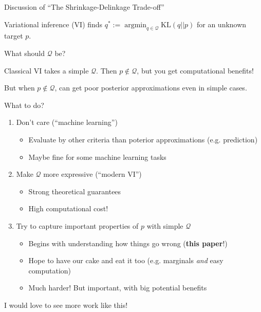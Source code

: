 \documentclass[8pt]{beamer}\usepackage[]{graphicx}\usepackage[]{color}
\DeclareMathOperator*{\argmin}{\mathrm{argmin}}
\def\kl#1#2{\mathrm{KL}\left(#1 || #2\right)}
\def\qdom{\mathcal{Q}}
\def\q{q}
\def\p{p}
\begin{document}

\begin{frame}{Discussion of ``The Shrinkage-Delinkage Trade-off''}

Variational inference (VI) finds
$q^* := \argmin_{\q \in \qdom} \kl{\q}{\p}$ for an unknown target $\p$.
%
%

What should $\qdom$ be?

\pause

Classical VI takes a simple $\qdom$. Then $\p \notin \qdom$, but 
you get computational benefits!

\pause

But when $\p \notin \qdom$, can get poor posterior approximations even in simple
cases.  

What to do?

\pause
%
\begin{enumerate}
%
\item Don't care (``machine learning'')
%
\begin{itemize}
    \item Evaluate by other criteria than
    poterior approximations (e.g. prediction)
    \item Maybe fine for some machine learning tasks
\end{itemize}
%
\pause
\item Make $\qdom$ more expressive (``modern VI'')
%
\begin{itemize}
    \item Strong theoretical guarantees
    \item High computational cost!
\end{itemize}
\pause
%
\item Try to capture important properties of $\p$ with simple $\qdom$
%
\begin{itemize}
    \item Begins with understanding how things go wrong (\textbf{this paper}!)
    \item Hope to have our cake and eat it too (e.g. marginals \emph{and} easy computation)
    \item Much harder!  But important, with big potential benefits
\end{itemize}
%
\end{enumerate}
%

I would love to see more work like this!




\end{frame}
\end{document}
